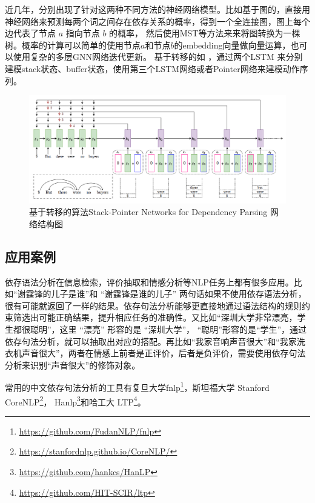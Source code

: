 近几年，分别出现了针对这两种不同方法的神经网络模型。比如基于图的\cite{dozat2016deep, ji2019graph, ma2017neural}，直接用神经网络来预测每两个词之间存在依存关系的概率，得到一个全连接图，图上每个边代表了节点 $a$ 指向节点 $b$ 的概率， 然后使用MST等方法来来将图转换为一棵树。概率的计算可以简单的使用节点$a$和节点$b$的embedding向量做向量运算，也可以使用复杂的多层GNN网络迭代更新。 基于转移的如 \cite{fernandez2019left, kiperwasser2016simple, ma2018stack}，通过两个LSTM 来分别建模stack状态、buffer状态，使用第三个LSTM网络或者Pointer网络来建模动作序列。 
\begin{figure}[h]
\centering
\includegraphics[scale=0.3]{img/chapter_nlp/parser_nn.png}
\caption{基于转移的算法Stack-Pointer Networks for Dependency Parsing 网络结构图}
\label{fig:parser_nn}
\end{figure}


\subsection{应用案例}
依存语法分析在信息检索，评价抽取和情感分析等NLP任务上都有很多应用。比如“谢霆锋的儿子是谁”和
“谢霆锋是谁的儿子” 两句话如果不使用依存语法分析，很有可能就返回了一样的结果。依存句法分析能够更直接地通过语法结构的规则约束筛选出可能正确结果，提升相应任务的准确性。又比如“深圳大学非常漂亮，学生都很聪明”，这里 “漂亮” 形容的是 “深圳大学”， “聪明”形容的是“学生”，通过依存句法分析，就可以抽取出对应的搭配。再比如“我家音响声音很大”和“我家洗衣机声音很大”，两者在情感上前者是正评价，后者是负评价，需要使用依存句法分析来识别“声音很大”的修饰对象。

常用的中文依存句法分析的工具有复旦大学fnlp\footnote{\url{https://github.com/FudanNLP/fnlp}}，斯坦福大学 Stanford CoreNLP\footnote{\url{https://stanfordnlp.github.io/CoreNLP/}}， Hanlp\footnote{\url{https://github.com/hankcs/HanLP}}和哈工大 LTP\footnote{\url{https://github.com/HIT-SCIR/ltp}}。





